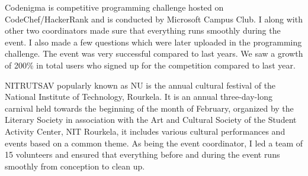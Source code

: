 \documentclass[]{deedy-resume-openfont}
\begin{document}
\begin{minipage}[t]{0.66\textwidth}
Codenigma is competitive programming challenge hosted on CodeChef/HackerRank and is conducted by Microsoft Campus Club. I along with other two coordinators made sure that everything runs smoothly during the event. I also made a few questions which were later uploaded in the programming challenge. The event was very successful compared to last years. We saw a growth of 200\% in total users who signed up for the competition compared to last year.
\sectionsep

NITRUTSAV popularly known as NU is the annual cultural festival of the National Institute of Technology, Rourkela. It is an annual three-day-long carnival held towards the beginning of the month of February, organized by the Literary Society in association with the Art and Cultural Society of the Student Activity Center, NIT Rourkela, it includes various cultural performances and events based on a common theme. As being the event coordinator, I led a team of 15 volunteers and ensured that everything before and during the event runs smoothly from conception to clean up.
\sectionsep






\end{minipage}
\end{document}
